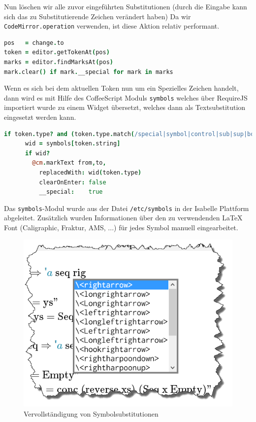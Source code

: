 Nun löschen wir alle zuvor eingeführten Substitutionen (durch die Eingabe kann sich das zu
Substitutierende Zeichen verändert haben) Da wir \texttt{CodeMirror.operation} verwenden, ist diese
Aktion relativ performant.

\begin{lstlisting}[language=coffee]
pos   = change.to
token = editor.getTokenAt(pos)          
marks = editor.findMarksAt(pos)
mark.clear() if mark.__special for mark in marks 
\end{lstlisting}

Wenn es sich bei dem aktuellen Token nun um ein Spezielles Zeichen handelt, dann wird es mit Hilfe
des CoffeeScript Moduls \texttt{symbols} welches über RequireJS importiert wurde zu einem Widget
übersetzt, welches dann als Textsubstitution eingesetzt werden kann.

\begin{lstlisting}[language=coffee]
    if token.type? and (token.type.match(/special|symbol|control|sub|sup|bold/))
      wid = symbols[token.string]
      if wid?
        @cm.markText from,to,          
          replacedWith: wid(token.type)
          clearOnEnter: false
          __special:    true
\end{lstlisting}

Das \texttt{symbols}-Modul wurde aus der Datei \texttt{/etc/symbols} in der Isabelle Plattform
abgeleitet. Zusätzlich wurden Informationen über den zu verwendenden LaTeX Font (Caligraphic,
Fraktur, AMS, ...) für jedes Symbol manuell eingearbeitet.

\begin{figure}[ht]
\centering
\includegraphics[width=0.5\linewidth]{images/completion}
  \caption{Vervollständigung von Symbolsubstitutionen}
  \label{fig:subst}
\end{figure}